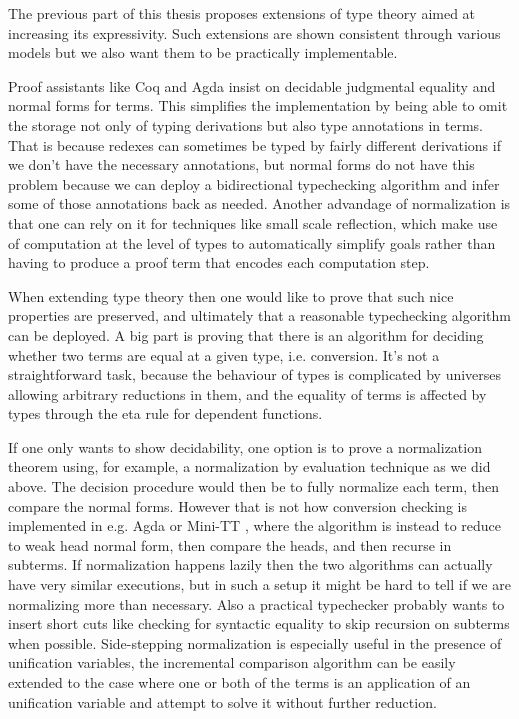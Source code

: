 \documentclass{book}
\begin{document}
The previous part of this thesis proposes extensions of type theory
aimed at increasing its expressivity. Such extensions are shown
consistent through various models but we also want them to be
practically implementable.

Proof assistants like Coq and Agda insist on decidable
judgmental equality and normal forms for terms. This simplifies the
implementation by being able to omit the storage not only of typing
derivations but also type annotations in terms. That is because
redexes can sometimes be typed by fairly different derivations if we
don't have the necessary annotations, but normal forms do not have
this problem because we can deploy a bidirectional typechecking
algorithm and infer some of those annotations back as needed. Another
advandage of normalization is that one can rely on it for techniques
like small scale reflection, which make use of computation at the
level of types to automatically simplify goals rather than having to
produce a proof term that encodes each computation step.

When extending type theory then one would like to prove that such nice
properties are preserved, and ultimately that a reasonable
typechecking algorithm can be deployed. A big part is proving that
there is an algorithm for deciding whether two terms are equal at a
given type, i.e. conversion. It's not a straightforward task, because
the behaviour of types is complicated by universes allowing arbitrary
reductions in them, and the equality of terms is affected by types
through the eta rule for dependent functions.

If one only wants to show decidability, one option is to prove a
normalization theorem using, for example, a normalization by
evaluation technique as we did above. The decision procedure would
then be to fully normalize each term, then compare the normal forms.
However that is not how conversion checking is implemented in
e.g. Agda or Mini-TT \cite{norell:PhD,minitt}, where the algorithm is instead to reduce
to weak head normal form, then compare the heads, and then recurse in
subterms. If normalization happens lazily then the two algorithms can
actually have very similar executions, but in such a setup it might be
hard to tell if we are normalizing more than necessary. Also a
practical typechecker probably wants to insert short cuts like
checking for syntactic equality to skip recursion on subterms when
possible. Side-stepping normalization is especially useful in the
presence of unification variables, the incremental comparison
algorithm can be easily extended to the case where one or both of the
terms is an application of an unification variable and attempt to
solve it without further reduction.
\end{document}
